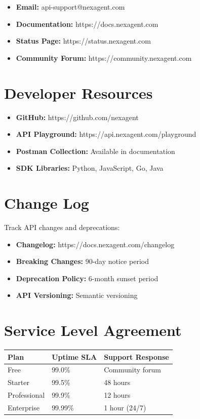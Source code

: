 \documentclass[11pt,a4paper]{report}
\begin{document}
\begin{itemize}[leftmargin=*]
    \item \textbf{Email:} api-support@nexagent.com
    \item \textbf{Documentation:} https://docs.nexagent.com
    \item \textbf{Status Page:} https://status.nexagent.com
    \item \textbf{Community Forum:} https://community.nexagent.com
\end{itemize}

\section{Developer Resources}

\begin{itemize}[leftmargin=*]
    \item \textbf{GitHub:} https://github.com/nexagent
    \item \textbf{API Playground:} https://api.nexagent.com/playground
    \item \textbf{Postman Collection:} Available in documentation
    \item \textbf{SDK Libraries:} Python, JavaScript, Go, Java
\end{itemize}

\section{Change Log}

Track API changes and deprecations:

\begin{itemize}[leftmargin=*]
    \item \textbf{Changelog:} https://docs.nexagent.com/changelog
    \item \textbf{Breaking Changes:} 90-day notice period
    \item \textbf{Deprecation Policy:} 6-month sunset period
    \item \textbf{API Versioning:} Semantic versioning
\end{itemize}

\section{Service Level Agreement}

\begin{longtable}{|l|l|l|}
\hline
\textbf{Plan} & \textbf{Uptime SLA} & \textbf{Support Response} \\ \hline
\endhead

Free & 99.0\% & Community forum \\ \hline
Starter & 99.5\% & 48 hours \\ \hline
Professional & 99.9\% & 12 hours \\ \hline
Enterprise & 99.99\% & 1 hour (24/7) \\ \hline

\end{longtable}
\end{document}
